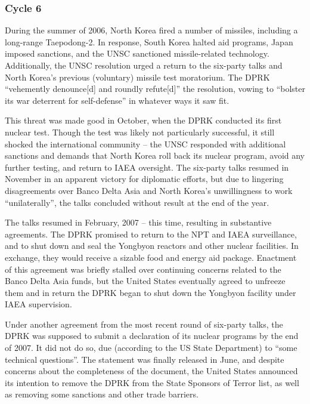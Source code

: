 \documentclass{article}
\begin{document}
\subsubsection{Cycle 6}

During the summer of 2006, North Korea fired a number of missiles, including a long-range Taepodong-2. In response, South Korea halted aid programs, Japan imposed sanctions, and the UNSC sanctioned missile-related technology\cite{greenlees}. Additionally, the UNSC resolution urged a return to the six-party talks and North Korea’s previous (voluntary) missile test moratorium\cite{unsc06}. The DPRK “vehemently denounce[d] and roundly refute[d]” the resolution, vowing to “bolster its war deterrent for self-defense” in whatever ways it saw fit\cite{kcna5}.

This threat was made good in October, when the DPRK conducted its first nuclear test\cite{nti15}. Though the test was likely not particularly successful, it still shocked the international community – the UNSC responded with additional sanctions and demands that North Korea roll back its nuclear program, avoid any further testing, and return to IAEA oversight\cite{unsc1718}. The six-party talks resumed in November in an apparent victory for diplomatic efforts, but due to lingering disagreements over Banco Delta Asia and North Korea’s unwillingness to work “unilaterally”, the talks concluded without result at the end of the year\cite{davenport}.

The talks resumed in February, 2007 – this time, resulting in substantive agreements. The DPRK promised to return to the NPT and IAEA surveillance, and to shut down and seal the Yongbyon reactors and other nuclear facilities. In exchange, they would receive a sizable food and energy aid package\cite{js5}. Enactment of this agreement was briefly stalled over continuing concerns related to the Banco Delta Asia funds, but the United States eventually agreed to unfreeze them and in return the DPRK began to shut down the Yongbyon facility under IAEA supervision\cite{davenport}.

Under another agreement from the most recent round of six-party talks, the DPRK was supposed to submit a declaration of its nuclear programs by the end of 2007\cite{js6}. It did not do so, due (according to the US State Department) to “some technical questions”\cite{seanm}. The statement was finally released in June, and despite concerns about the completeness of the document, the United States announced its intention to remove the DPRK from the State Sponsors of Terror list, as well as removing some sanctions and other trade barriers\cite{nti15}.
\end{document}

